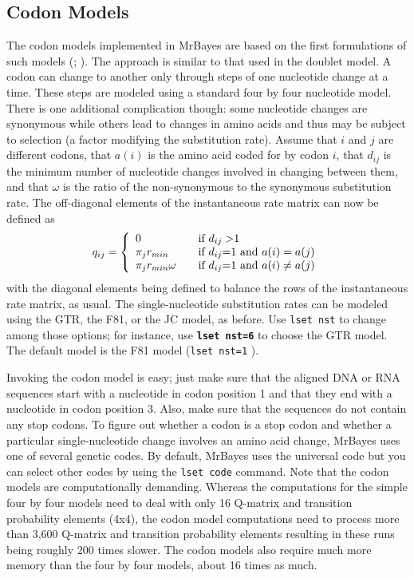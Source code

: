 \documentclass[12pt]{book}
\newcommand{\ttt}[1]{\texttt{#1} }
\newcommand{\tb}[1]{\texttt{\textbf{#1}} }
\begin{document}
\subsection{Codon Models}
The codon models implemented in MrBayes are based on the first formulations of such
models (\citet{goldman94}; \citet{muse94}). The approach is similar to that
used in the doublet model. A codon can change to another only through steps of one
nucleotide change at a time. These steps are modeled using a standard four by four
nucleotide model. There is one additional complication though: some nucleotide changes
are synonymous while others lead to changes in amino acids and thus may be subject to
selection (a factor modifying the substitution rate). Assume that $i$ and $j$ are different
codons, that $a(i)$ is the amino acid coded for by codon $i$, that $d_{ij}$ is the minimum number
of nucleotide changes involved in changing between them, and that $\omega$ is the ratio of the
non-synonymous to the synonymous substitution rate. The off-diagonal elements of the
instantaneous rate matrix can now be defined as
\[
q_{ij} = \left\{ 
\begin{array}{l l}
  0 & \quad \text{if $d_{ij}>$1 } \\
 \pi_j r_{min} & \quad \text{if $d_{ij}$=1 and $a(i)=a(j)$}\\
 \pi_j r_{min} \omega & \quad \text{if $d_{ij}$=1 and $a(i)\neq a(j)$}\\
\end{array} \right.
\]
with the diagonal elements being defined to balance the rows of the instantaneous rate
matrix, as usual. The single-nucleotide substitution rates can be modeled using the GTR,
the F81, or the JC model, as before. Use \ttt{lset nst} to change among those options; for
instance, use \tb{lset nst=6} to choose the GTR model. The default model is the F81
model (\ttt{lset nst=1}).

Invoking the codon model is easy; just make sure that the aligned DNA or RNA
sequences start with a nucleotide in codon position 1 and that they end with a nucleotide
in codon position 3. Also, make sure that the sequences do not contain any stop codons.
To figure out whether a codon is a stop codon and whether a particular single-nucleotide
change involves an amino acid change, MrBayes uses one of several genetic codes. By
default, MrBayes uses the universal code but you can select other codes by using the
\ttt{lset code} command. Note that the codon models are computationally demanding.
Whereas the computations for the simple four by four models need to deal with only 16
Q-matrix and transition probability elements (4x4), the codon model computations need
to process more than 3,600 Q-matrix and transition probability elements resulting in these
runs being roughly 200 times slower. The codon models also require much more memory
than the four by four models, about 16 times as much.
\end{document}
